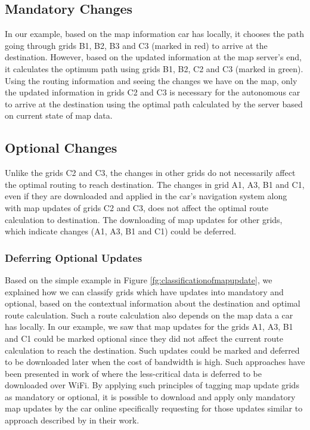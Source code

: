 \subsection{Mandatory Changes}
In our example, based on the map information car has locally, it chooses the path going through grids B1, B2, B3 and C3 (marked in red) to arrive at the destination. However, based on the updated information at the map server's end, it calculates the optimum path using grids B1, B2, C2 and C3 (marked in green). Using the routing information and seeing the changes we have on the map, only the updated information in grids C2 and C3 is necessary for the autonomous car to arrive at the destination using the optimal path calculated by the server based on current state of map data. 
\subsection{Optional Changes}
Unlike the grids C2 and C3, the changes in other grids do not necessarily affect the optimal routing to reach destination. The changes in grid A1, A3, B1 and C1, even if they are downloaded and applied in the car's navigation system along with map updates of grids C2 and C3, does not affect the optimal route calculation to destination. The downloading of map updates for other grids, which indicate changes (A1, A3, B1 and C1) could be deferred. 
\subsubsection{Deferring Optional Updates}
Based on the simple example in Figure \ref{fg:classificationofmapupdate}, we explained how we can classify grids which have updates into mandatory and optional, based on the contextual information about the destination and optimal route calculation. Such a route calculation also depends on the map data a car has locally. In our example, we saw that map updates for the grids A1, A3, B1 and C1 could be marked optional since they did not affect the current route calculation to reach the destination. Such updates could be marked and deferred to be downloaded later when the cost of bandwidth is high. Such approaches have been presented in work of \citet{balasubramanian2010augmenting} where the less-critical data is deferred to be downloaded over WiFi. By applying such principles of tagging map update grids as mandatory or optional, it is possible to download and apply only mandatory map updates by the car online specifically requesting for those updates similar to approach described by \citet{min2011system} in their work. \\

